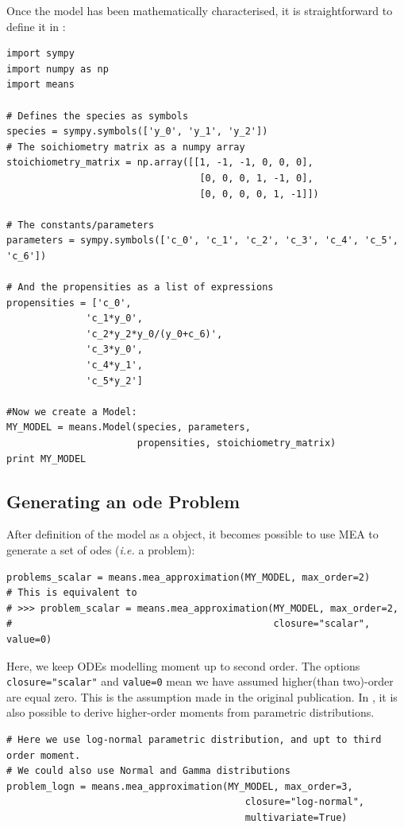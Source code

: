 Once the model has been mathematically characterised, it is straightforward to define it in \means:


\begin{framed}
\begin{verbatim}
import sympy
import numpy as np
import means

# Defines the species as symbols
species = sympy.symbols(['y_0', 'y_1', 'y_2'])
# The soichiometry matrix as a numpy array
stoichiometry_matrix = np.array([[1, -1, -1, 0, 0, 0],
                                  [0, 0, 0, 1, -1, 0],
                                  [0, 0, 0, 0, 1, -1]])

# The constants/parameters
parameters = sympy.symbols(['c_0', 'c_1', 'c_2', 'c_3', 'c_4', 'c_5', 'c_6'])

# And the propensities as a list of expressions
propensities = ['c_0',
              'c_1*y_0',
              'c_2*y_2*y_0/(y_0+c_6)',
              'c_3*y_0',
              'c_4*y_1',
              'c_5*y_2']

#Now we create a Model:
MY_MODEL = means.Model(species, parameters,
                       propensities, stoichiometry_matrix)
print MY_MODEL
\end{verbatim}
\end{framed}

\subsection{Generating an \gls{ode} Problem}
After definition of the model as a \py{} object, it becomes possible to use MEA to generate a set of \gls{ode}s (\emph{i.e.} a problem):


\begin{framed}
\begin{verbatim}
problems_scalar = means.mea_approximation(MY_MODEL, max_order=2)
# This is equivalent to
# >>> problem_scalar = means.mea_approximation(MY_MODEL, max_order=2,
#                                              closure="scalar", value=0)
\end{verbatim}
\end{framed}
Here, we keep ODEs modelling moment up to second order. The options \texttt{closure="scalar"} and \texttt{value=0} mean we have assumed higher(than two)-order are equal zero.
This is the assumption made in the original publication\cite{ale_general_2013}. In \means, it is also possible to derive higher-order moments from parametric distributions.

\begin{framed}
\begin{verbatim}
# Here we use log-normal parametric distribution, and upt to third order moment.
# We could also use Normal and Gamma distributions
problem_logn = means.mea_approximation(MY_MODEL, max_order=3,
                                          closure="log-normal",
                                          multivariate=True)
                                          
\end{verbatim}
\end{framed}

